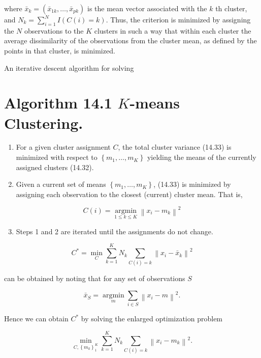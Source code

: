 \documentclass[10pt]{article}
\begin{document}
where $\bar{x}_{k}=\left(\bar{x}_{1 k}, \ldots, \bar{x}_{p k}\right)$ is the mean vector associated with the $k$ th cluster, and $N_{k}=\sum_{i=1}^{N} I(C(i)=k)$. Thus, the criterion is minimized by assigning the $N$ observations to the $K$ clusters in such a way that within each cluster the average dissimilarity of the observations from the cluster mean, as defined by the points in that cluster, is minimized.

An iterative descent algorithm for solving

\section*{Algorithm 14.1 $K$-means Clustering.}
\begin{enumerate}
  \item For a given cluster assignment $C$, the total cluster variance (14.33) is minimized with respect to $\left\{m_{1}, \ldots, m_{K}\right\}$ yielding the means of the currently assigned clusters (14.32).
  \item Given a current set of means $\left\{m_{1}, \ldots, m_{K}\right\}$, (14.33) is minimized by assigning each observation to the closest (current) cluster mean. That is,
\end{enumerate}


\begin{equation*}
C(i)=\underset{1 \leq k \leq K}{\operatorname{argmin}}\left\|x_{i}-m_{k}\right\|^{2} \tag{14.34}
\end{equation*}


\begin{enumerate}
  \setcounter{enumi}{2}
  \item Steps 1 and 2 are iterated until the assignments do not change.
\end{enumerate}

$$
C^{*}=\min _{C} \sum_{k=1}^{K} N_{k} \sum_{C(i)=k}\left\|x_{i}-\bar{x}_{k}\right\|^{2}
$$

can be obtained by noting that for any set of observations $S$


\begin{equation*}
\bar{x}_{S}=\underset{m}{\operatorname{argmin}} \sum_{i \in S}\left\|x_{i}-m\right\|^{2} . \tag{14.32}
\end{equation*}


Hence we can obtain $C^{*}$ by solving the enlarged optimization problem


\begin{equation*}
\min _{C,\left\{m_{k}\right\}_{1}^{K}} \sum_{k=1}^{K} N_{k} \sum_{C(i)=k}\left\|x_{i}-m_{k}\right\|^{2} . \tag{14.33}
\end{equation*}
\end{document}
